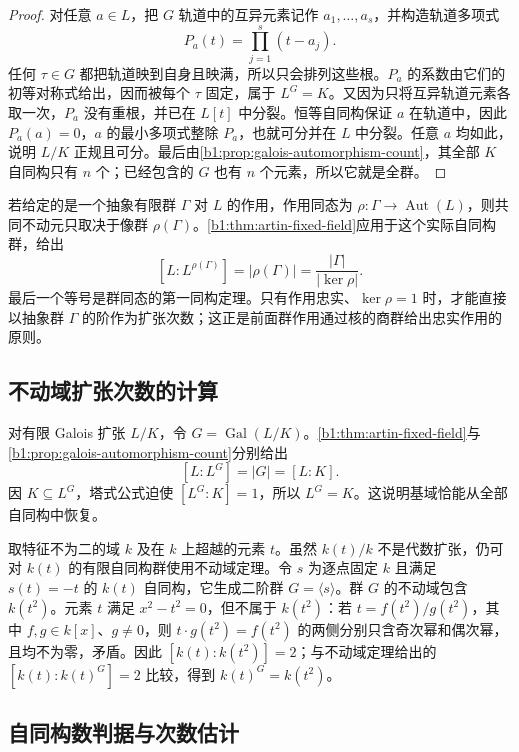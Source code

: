 \begin{proof}
	对任意 \(a\in L\)，把 \(G\) 轨道中的互异元素记作 \(a_1,\ldots,a_s\)，并构造轨道多项式
	\[
		P_a(t)=\prod_{j=1}^s(t-a_j).
	\]
	任何 \(\tau\in G\) 都把轨道映到自身且映满，所以只会排列这些根。\(P_a\) 的系数由它们的初等对称式给出，因而被每个 \(\tau\) 固定，属于 \(L^G=K\)。又因为只将互异轨道元素各取一次，\(P_a\) 没有重根，并已在 \(L[t]\) 中分裂。恒等自同构保证 \(a\) 在轨道中，因此 \(P_a(a)=0\)，\(a\) 的最小多项式整除 \(P_a\)，也就可分并在 \(L\) 中分裂。任意 \(a\) 均如此，说明 \(L/K\) 正规且可分。最后由\cref{b1:prop:galois-automorphism-count}，其全部 \(K\) 自同构只有 \(n\) 个；已经包含的 \(G\) 也有 \(n\) 个元素，所以它就是全群。
\end{proof}

若给定的是一个抽象有限群 \(\Gamma\) 对 \(L\) 的作用，作用同态为 \(\rho:\Gamma\rightarrow\operatorname{Aut}(L)\)，则共同不动元只取决于像群 \(\rho(\Gamma)\)。\cref{b1:thm:artin-fixed-field}应用于这个实际自同构群，给出
\[
	[L:L^{\rho(\Gamma)}]=|\rho(\Gamma)| =\frac{|\Gamma|}{|\ker\rho|}.
\]
最后一个等号是群同态的第一同构定理。只有作用忠实、\(\ker\rho=1\) 时，才能直接以抽象群 \(\Gamma\) 的阶作为扩张次数；这正是前面群作用通过核的商群给出忠实作用的原则。

\subsection{不动域扩张次数的计算}
\label{b1:subsec:1901:04}

对有限 Galois 扩张 \(L/K\)，令 \(G=\operatorname{Gal}(L/K)\)。\cref{b1:thm:artin-fixed-field}与\cref{b1:prop:galois-automorphism-count}分别给出
\[
	[L:L^G]=|G|=[L:K].
\]
因 \(K\subseteq L^G\)，塔式公式迫使 \([L^G:K]=1\)，所以 \(L^G=K\)。这说明基域恰能从全部自同构中恢复。

\ProseParagraphBreak
取特征不为二的域 \(k\) 及在 \(k\) 上超越的元素 \(t\)。虽然 \(k(t)/k\) 不是代数扩张，仍可对 \(k(t)\) 的有限自同构群使用不动域定理。令 \(s\) 为逐点固定 \(k\) 且满足 \(s(t)=-t\) 的 \(k(t)\) 自同构，它生成二阶群 \(G=\langle s\rangle\)。群 \(G\) 的不动域包含 \(k(t^2)\)。元素 \(t\) 满足 \(x^2-t^2=0\)，但不属于 \(k(t^2)\)：若 \(t=f(t^2)/g(t^2)\)，其中 \(f,g\in k[x]\)、\(g\ne0\)，则 \(t\cdot g(t^2)=f(t^2)\) 的两侧分别只含奇次幂和偶次幂，且均不为零，矛盾。因此 \([k(t):k(t^2)]=2\)；与不动域定理给出的 \([k(t):k(t)^G]=2\) 比较，得到 \(k(t)^G=k(t^2)\)。

\subsection{自同构数判据与次数估计}
\label{b1:subsec:1901:05}

